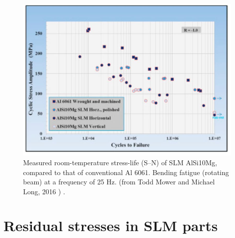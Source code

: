 \begin{figure}[ht]
\centering
\includegraphics[scale=0.5]{Images/Fat}
\decoRule
\caption[Measured room-temperature stress-life (S–N) of SLM AlSi10Mg, compared to that of conventional Al 6061. Bending fatigue (rotating beam) at a frequency of 25 Hz. ]{Measured room-temperature stress-life (S–N) of SLM AlSi10Mg, compared to that of conventional Al 6061. Bending fatigue (rotating beam) at a frequency of 25 Hz. (from Todd Mower and Michael Long, 2016 \parencite{MOWER2016198}) .}
\label{Fat}
\end{figure} 
 
%

\section{Residual stresses in SLM parts}
\label{EARSSP}

